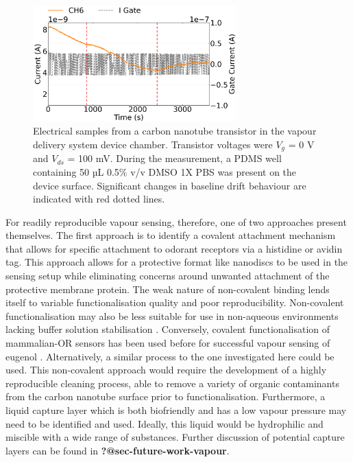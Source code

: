 \documentclass[
  a4paper,
]{scrbook}
\begin{document}
\begin{figure}

{\centering \includegraphics[width=0.7\textwidth,height=\textheight]{figures/ch9/Q39C11.png}

}

\caption{\label{fig-buffer-vapour}Electrical samples from a carbon
nanotube transistor in the vapour delivery system device chamber.
Transistor voltages were \(V_{g}\) = 0 V and \(V_{ds}\) = 100 mV. During
the measurement, a PDMS well containing 50 µL 0.5\% v/v DMSO 1X PBS was
present on the device surface. Significant changes in baseline drift
behaviour are indicated with red dotted lines.}

\end{figure}

For readily reproducible vapour sensing, therefore, one of two
approaches present themselves. The first approach is to identify a
covalent attachment mechanism that allows for specific attachment to
odorant receptors via a histidine or avidin tag. This approach allows
for a protective format like nanodiscs to be used in the sensing setup
while eliminating concerns around unwanted attachment of the protective
membrane protein. The weak nature of non-covalent binding lends itself
to variable functionalisation quality and poor reproducibility.
Non-covalent functionalisation may also be less suitable for use in
non-aqueous environments lacking buffer solution stabilisation
\autocite{Li2023}. Conversely, covalent functionalisation of
mammalian-OR sensors has been used before for successful vapour sensing
of eugenol \autocite{Goldsmith2011}. Alternatively, a similar process to
the one investigated here could be used. This non-covalent approach
would require the development of a highly reproducible cleaning process,
able to remove a variety of organic contaminants from the carbon
nanotube surface prior to functionalisation. Furthermore, a liquid
capture layer which is both biofriendly and has a low vapour pressure
may need to be identified and used. Ideally, this liquid would be
hydrophilic and miscible with a wide range of substances. Further
discussion of potential capture layers can be found in
\textbf{?@sec-future-work-vapour}.
\end{document}
